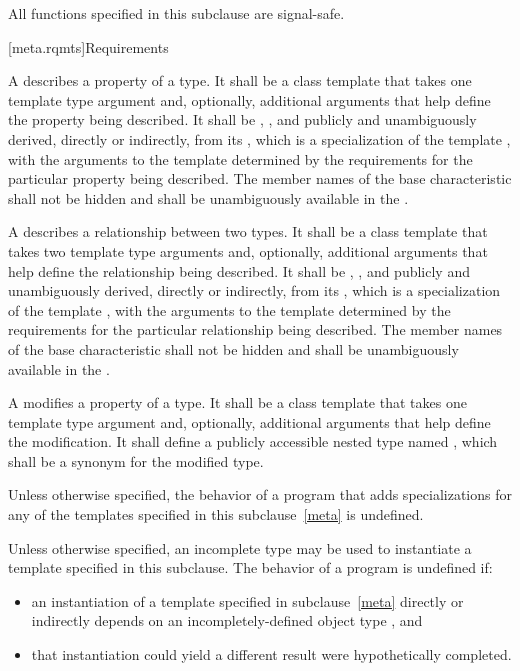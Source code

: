 \pnum
{}%
All functions specified in this subclause are signal-safe.

[meta.rqmts]{Requirements}

\pnum
A  describes a property
of a type. It shall be a class template that takes one template type
argument and, optionally, additional arguments that help define the
property being described. It shall be ,
,
and publicly and unambiguously derived, directly or indirectly, from
its , which is
a specialization of the template
, with
the arguments to the template  determined by the
requirements for the particular property being described.
The member names of the base characteristic shall not be hidden and shall be
unambiguously available in the .

\pnum
A  describes a
relationship between two types. It shall be a class template that
takes two template type arguments and, optionally, additional
arguments that help define the relationship being described. It shall
be , ,
and publicly and unambiguously derived, directly or
indirectly, from
its , which is a specialization
of the template
, with
the arguments to the template  determined by the
requirements for the particular relationship being described.
The member names of the base characteristic shall not be hidden and shall be
unambiguously available in the .

\pnum
A 
modifies a property
of a type. It shall be a class template that takes one
template type argument and, optionally, additional arguments that help
define the modification. It shall define a publicly accessible nested type
named , which shall be a synonym for the modified type.

\pnum
Unless otherwise specified,
the behavior of a program that adds specializations
for any of the templates specified in this subclause~\ref{meta}
is undefined.

\pnum
Unless otherwise specified, an incomplete type may be used
to instantiate a template specified in this subclause.
The behavior of a program is undefined if:
\begin{itemize}
\item
  an instantiation of a template specified in subclause~\ref{meta}
  directly or indirectly depends on
  an incompletely-defined object type , and
\item
  that instantiation could yield a different result
  were  hypothetically completed.
\end{itemize}

